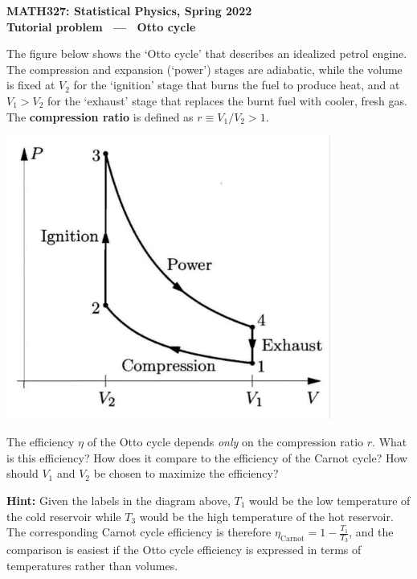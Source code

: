 \documentclass[12 pt]{article} %
\begin{document}
\newcommand{\thisunit}{MATH327 Tutorial (Cycle)}
\newcommand{\moddate}{Last modified 11 Mar.~2022}
\begin{center}
  {\Large \textbf{MATH327: Statistical Physics, Spring 2022}} \\[12 pt]
  {\Large \textbf{Tutorial problem \ --- \ Otto cycle}} \\[24 pt]
\end{center}

The figure below shows the `Otto cycle' that describes an idealized petrol engine.
The compression and expansion (`power') stages are adiabatic, while the volume is fixed at $V_2$ for the `ignition' stage that burns the fuel to produce heat, and at $V_1 > V_2$ for the `exhaust' stage that replaces the burnt fuel with cooler, fresh gas.
The \textbf{compression ratio} is defined as $r \equiv V_1 / V_2 > 1$.

\begin{center}\includegraphics[width=0.8\textwidth]{figs/Otto.pdf}\end{center}

The efficiency $\eta$ of the Otto cycle depends \emph{only} on the compression ratio $r$.
What is this efficiency?
How does it compare to the efficiency of the Carnot cycle?
How should $V_1$ and $V_2$ be chosen to maximize the efficiency?

\textbf{Hint:} Given the labels in the diagram above, $T_1$ would be the low temperature of the cold reservoir while $T_3$ would be the high temperature of the hot reservoir.
The corresponding Carnot cycle efficiency is therefore $\eta_{\text{Carnot}} = 1 - \frac{T_1}{T_3}$, and the comparison is easiest if the Otto cycle efficiency is expressed in terms of temperatures rather than volumes.
\end{document}
